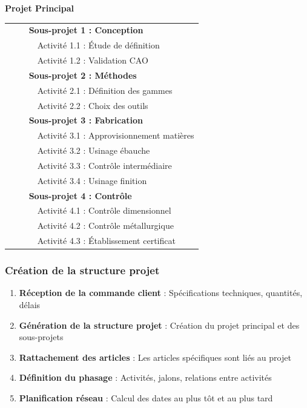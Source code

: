 \documentclass{article}
\begin{document}
\begin{tcolorbox}[colback=grisclair, colframe=gray!70!black, title=Structure d'un projet PCS]
\begin{center}
\textbf{Projet Principal}
\end{center}
\begin{tabular}{ll}
& $\quad$ \textbf{Sous-projet 1 : Conception} \\
& $\qquad$ Activité 1.1 : Étude de définition \\
& $\qquad$ Activité 1.2 : Validation CAO \\
& $\quad$ \textbf{Sous-projet 2 : Méthodes} \\
& $\qquad$ Activité 2.1 : Définition des gammes \\
& $\qquad$ Activité 2.2 : Choix des outils \\
& $\quad$ \textbf{Sous-projet 3 : Fabrication} \\
& $\qquad$ Activité 3.1 : Approvisionnement matières \\
& $\qquad$ Activité 3.2 : Usinage ébauche \\
& $\qquad$ Activité 3.3 : Contrôle intermédiaire \\
& $\qquad$ Activité 3.4 : Usinage finition \\
& $\quad$ \textbf{Sous-projet 4 : Contrôle} \\
& $\qquad$ Activité 4.1 : Contrôle dimensionnel \\
& $\qquad$ Activité 4.2 : Contrôle métallurgique \\
& $\qquad$ Activité 4.3 : Établissement certificat \\
\end{tabular}
\end{tcolorbox}

\subsubsection{Création de la structure projet}

\begin{enumerate}
    \item \textbf{Réception de la commande client} : Spécifications techniques, quantités, délais
    \item \textbf{Génération de la structure projet} : Création du projet principal et des sous-projets
    \item \textbf{Rattachement des articles} : Les articles spécifiques sont liés au projet
    \item \textbf{Définition du phasage} : Activités, jalons, relations entre activités
    \item \textbf{Planification réseau} : Calcul des dates au plus tôt et au plus tard
\end{enumerate}
\end{document}
